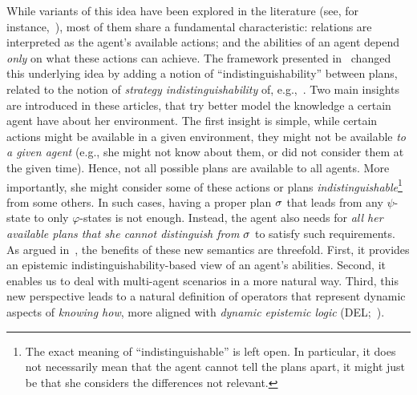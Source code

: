 While variants of this idea have been explored in the literature (see, for instance,~\cite{Li17,LiWang17,FervariHLW17,Wang19a}),
most of them share a fundamental characteristic: relations are interpreted as the agent's available actions; and the abilities of an agent depend \emph{only} on what these actions can achieve. The framework presented in~\cite{AFSVQ21,AFSVQ23report} changed this underlying idea by adding a notion of ``indistinguishability'' between plans, related to the notion of \emph{strategy indistinguishability} of, e.g.,~\cite{JamrogaH04,Belardinelli14}. Two main insights are introduced in these articles, that try better model the knowledge a certain agent have about her environment.  The first insight is simple, while certain actions might be available in a given environment, they might not be available \emph{to a given agent} (e.g., she might not know about them, or did not consider them at the given time). Hence, not all possible plans are available to all agents.  More importantly, she might consider some of these actions or plans \emph{indistinguishable}\footnote{The exact meaning of ``indistinguishable'' is left open. In particular, it does not necessarily mean that the agent cannot tell the plans apart, it might just be that she considers the differences not relevant.} from some others. In such cases, having a proper plan $\sigma$ that leads from any $\psi$-state to only $\varphi$-states is not enough. Instead, the agent also needs for \emph{all her available plans that she cannot distinguish from $\sigma$} to satisfy such requirements. As argued in~\cite{AFSVQ21}, the benefits of these new semantics are threefold. First, it provides an epistemic indistinguishability-based  view of an agent's abilities. Second, it enables us to deal with multi-agent scenarios in a more natural way. Third, this new perspective leads to a natural definition of operators that represent dynamic aspects of \emph{knowing how}, more aligned with \emph{dynamic epistemic logic} (DEL;~\cite{DELbook}).



